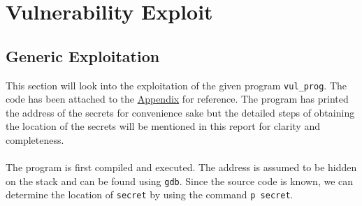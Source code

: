 \documentclass[a4paper,12pt]{article}
\begin{document}
	\section{Vulnerability Exploit}
	\subsection{Generic Exploitation}
	This section will look into the exploitation of the given program \texttt{vul\_prog}. The code has been attached to the \hyperref[Appsec:3.1]{Appendix} for reference. The program has printed the address of the secrets for convenience sake but the detailed steps of obtaining the location of the secrets will be mentioned in this report for clarity and completeness.\\\\The program is first compiled and executed. The address is assumed to be hidden on the stack and can be found using \texttt{gdb}. Since the source code is known, we can determine the location of \texttt{secret} by using the command \texttt{p secret}.
	
\end{document}

